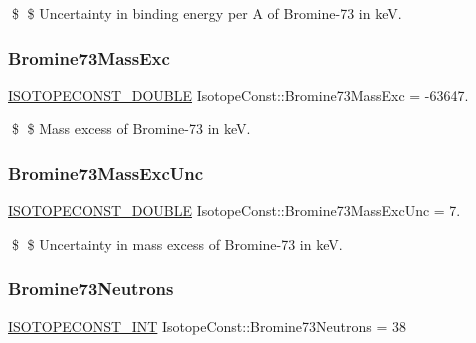 \$ \$ Uncertainty in binding energy per A of Bromine-\/73 in keV. \mbox{\label{group___isotope_const-_bromine-_br73_ga9ad84226f97358899a7272d8ec64d3b9}} 
\subsubsection{\texorpdfstring{Bromine73\+Mass\+Exc}{Bromine73MassExc}}
{\footnotesize\ttfamily \mbox{\hyperlink{group___isotope_const-_macros_ga8f45a7272ce02c0b4c65c44636ed719a}{I\+S\+O\+T\+O\+P\+E\+C\+O\+N\+S\+T\+\_\+\+D\+O\+U\+B\+LE}} Isotope\+Const\+::\+Bromine73\+Mass\+Exc = -\/63647.}

\$ \$ Mass excess of Bromine-\/73 in keV. \mbox{\label{group___isotope_const-_bromine-_br73_gae1de26124293aa540759ae38f876e3ca}} 
\subsubsection{\texorpdfstring{Bromine73\+Mass\+Exc\+Unc}{Bromine73MassExcUnc}}
{\footnotesize\ttfamily \mbox{\hyperlink{group___isotope_const-_macros_ga8f45a7272ce02c0b4c65c44636ed719a}{I\+S\+O\+T\+O\+P\+E\+C\+O\+N\+S\+T\+\_\+\+D\+O\+U\+B\+LE}} Isotope\+Const\+::\+Bromine73\+Mass\+Exc\+Unc = 7.}

\$ \$ Uncertainty in mass excess of Bromine-\/73 in keV. \mbox{\label{group___isotope_const-_bromine-_br73_ga83fb2049ddbaa2ef8cdc2f3f5f743333}} 
\subsubsection{\texorpdfstring{Bromine73\+Neutrons}{Bromine73Neutrons}}
{\footnotesize\ttfamily \mbox{\hyperlink{group___isotope_const-_macros_ga5f18360b3e99483a35c32d789e62621c}{I\+S\+O\+T\+O\+P\+E\+C\+O\+N\+S\+T\+\_\+\+I\+NT}} Isotope\+Const\+::\+Bromine73\+Neutrons = 38}

